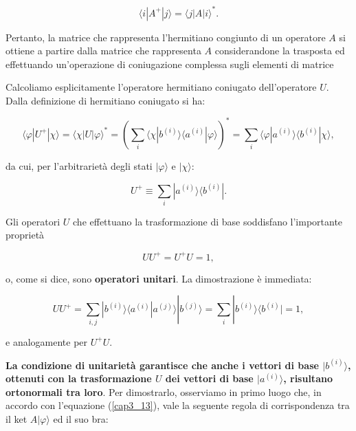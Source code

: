 \documentclass[a4paper,12pt,oneside]{book}
\begin{document}
\begin{equation}
\langle i | A^{+} | j \rangle = \langle j | A | i \rangle ^* .
\end{equation}

Pertanto, la matrice che rappresenta l'hermitiano congiunto di un operatore $A$ si ottiene a partire dalla matrice che rappresenta $A$ considerandone la trasposta ed effettuando un'operazione di coniugazione complessa sugli elementi di matrice


Calcoliamo esplicitamente l'operatore hermitiano coniugato dell'operatore $U$. Dalla definizione di hermitiano coniugato si ha:

\begin{equation}
\langle \varphi | U^{+} | \chi \rangle = \langle \chi | U | \varphi \rangle ^* =  \left( \sum \limits_{i} \langle \chi | b^{(i)} \rangle \langle a^{(i)} | \varphi \rangle \right)^* =\sum \limits_{i} \langle \varphi | a^{(i)}\rangle \langle b^{(i)} | \chi \rangle ,
\end{equation}

da cui, per l'arbitrarietà degli stati $| \varphi \rangle $ e $| \chi \rangle $:

\begin{equation}
U^+ \equiv \sum \limits_{i} | a^{(i)} \rangle \langle b^{(i)} |  .
\end{equation}

Gli operatori $U$ che effettuano la trasformazione di base soddisfano l'importante proprietà

\begin{equation}
UU^+= U^+U=1 ,
\end{equation}

o, come si dice, sono \textbf{operatori unitari}. La dimostrazione è immediata:

\begin{equation}
UU^+ = \sum\limits_{i,j}  | b^{(i)} \rangle \langle a^{(i)} | a^{(j)} \rangle | b^{(j)} \rangle = 
\sum\limits_{i} | b^{(i)} \rangle \langle b^{(i)} | = 1 ,
\end{equation}

e analogamente per $U^+U$.

\textbf{La condizione di unitarietà garantisce che anche i vettori di base $| b^{(i)} \rangle $, ottenuti con la trasformazione $U$ dei vettori di base $| a^{(i)} \rangle $, risultano ortonormali tra loro}. Per dimostrarlo, osserviamo in primo luogo che, in accordo con l'equazione (\ref{cap3_13}), vale la seguente regola di corrispondenza tra il ket $A | \varphi \rangle $ ed il suo bra:
\end{document}
